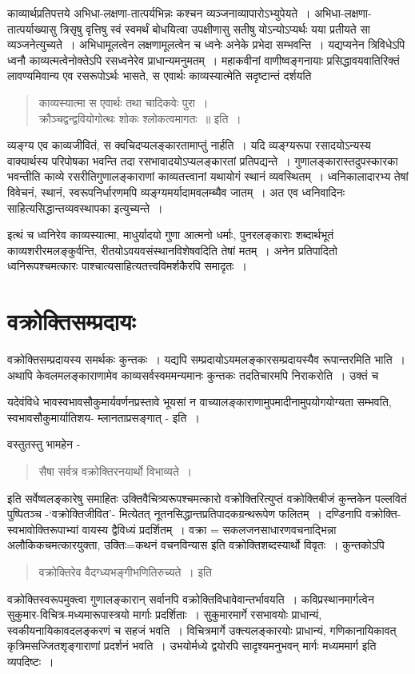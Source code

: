 {काव्यार्थप्रतिपत्तये अभिधा-लक्षणा-तात्पर्यभिन्नः कश्चन व्यञ्जनाव्यापारोऽभ्युपेयते~। अभिधा-लक्षणा-तात्पर्याख्यासु त्रिसृषु वृत्तिषु स्वं स्वमर्थं बोधयित्वा उपक्षीणासु सतीषु योऽन्योऽप्यर्थः यया प्रतीयते सा व्यञ्जनेत्युच्यते~। अभिधामूलत्वेन लक्षणामूलत्वेन च ध्वनेः अनेके प्रभेदा सम्भवन्ति~। यद्यप्यनेन त्रिविधेऽपि ध्वनौ काव्यत्मत्वेनोक्तेऽपि रसध्वनेरेव प्राधान्यमनुमतम्~। महाकवीनां वाणीष्वङ्गनायाः प्रसिद्धावयवातिरिक्तं लावण्यमिवान्य एव रसरूपोऽर्थः भासते, स एवार्थः काव्यस्यात्मेति सदृष्टान्तं दर्शयति 

\begin{verse}
काव्यस्यात्मा स एवार्थः तथा चादिकवेः पुरा~। \\
क्रौञ्चद्वन्द्ववियोगोत्थः शोकः श्लोकत्वमागतः~॥ इति~। 
\end{verse}
व्यङ्ग्य एव काव्यजीवितं, स क्वचिदप्यलङ्कारतामाप्तुं नार्हति~। यदि व्यङ्ग्यरूपा रसादयोऽन्यस्य वाक्यार्थस्य परिपोषका भवन्ति तदा रसभावादयोऽप्यलङ्कारतां प्रतिपद्यन्ते~। गुणालङ्कारास्तदुपस्कारका भवन्तीति काव्ये रसरीतिगुणालङ्काराणां काव्यतत्त्वानां यथायोगं स्थानं व्यवस्थितम्~। ध्वनिकालादारभ्य तेषां विवेचनं, स्थानं, स्वरूपनिर्धारणमपि व्यङ्ग्यमर्यादामवलम्ब्यैव जातम्~। अत एव ध्वनिवादिनः साहित्यसिद्धान्तव्यवस्थापका इत्युच्यन्ते~। 

इत्थं च ध्वनिरेव काव्यस्यात्मा, माधुर्यादयो गुणा आत्मनो धर्माः, पुनरलङ्काराः शब्दार्थभूतं काव्यशरीरमलङ्कुर्वन्ति, रीतयोऽवयवसंस्थानविशेषवदिति तेषां मतम्~। अनेन प्रतिपादितो ध्वनिरूपश्चमत्कारः पाश्चात्यसाहित्यतत्त्वविमर्शकैरपि समादृतः~। 

\section*{ वक्रोक्तिसम्प्रदायः} 

वक्रोक्तिसम्प्रदायस्य समर्थकः कुन्तकः~। यद्यपि सम्प्रदायोऽयमलङ्कारसम्प्रदायस्यैव रूपान्तरमिति भाति~। अथापि केवलमलङ्काराणामेव काव्यसर्वस्वममन्यमानः कुन्तकः तदतिचारमपि निराकरोति~। उक्तं च \enginline{-} 

यदेवंविधे भावस्वभावसौकुमार्यवर्णनप्रस्तावे भूयसां न वाच्यालङ्काराणामुपमादीनामुपयोगयोग्यता सम्भवति, स्वभावसौ\-कुमार्यातिशय- म्लानताप्रसङ्गात् - इति~। 

वस्तुतस्तु भामहेन - 
\begin{verse}
सैषा सर्वत्र वक्रोक्तिरनयार्थो विभाव्यते~।
\end{verse}
इति सर्वेष्वलङ्कारेषु समाहितः उक्तिवैचित्र्यरूपश्चमत्कारो वक्रोक्तिरित्युप्तं वक्रोक्तिबीजं कुन्तकेन पल्लवितं पुष्पितञ्च -‘वक्रोक्तिजीवित’- मित्येतत् नूतनसिद्धान्तप्रतिपादकग्रन्थरूपेण फलितम्~। दण्डिनापि वक्रोक्ति-स्वभावोक्तिरूपाभ्यां वायस्य द्वैविध्यं प्रदर्शितम्~। वक्रा = सकलजनसाधारणवचनाद्भिन्ना अलौकिकचमत्कारयुक्ता, उक्तिः=कथनं वचनविन्यास इति वक्रोक्तिशब्दस्यार्थो विवृतः~। कुन्तकोऽपि
\begin{verse}
वक्रोक्तिरेव वैदग्ध्यभङ्गीभणितिरुच्यते~। इति
\end{verse}
वक्रोक्तिस्वरूपमुक्त्वा गुणालङ्कारान् सर्वानपि वक्रोक्तिविधावेवान्तर्भावयति~। कविप्रस्थान\-मार्गत्वेन सुकुमार-विचित्र-मध्यमारूपास्त्रयो मार्गाः प्रदर्शिताः~। सुकुमारमार्गे रसभावयोः प्राधान्यं, स्वकीयनायिकावदलङ्करणं च सहजं भवति~। विचित्रमार्गे उक्त्यलङ्कारयोः प्राधान्यं, गणिकानायिकावत् कृत्रिमसज्जितशृङ्गाराणां प्रदर्शनं भवति~। उभयोर्मध्ये द्वयोरपि सादृश्यमनुभवन् मार्गः मध्यममार्ग इति व्यपदिष्टः~। 

}
